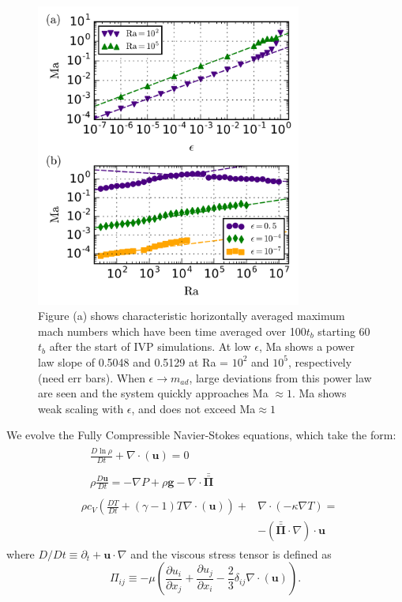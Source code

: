 \documentclass[aps, prl, twocolumn, groupedaddress, amsfonts, amssymb, amsmath]{revtex4-1}
\newcommand{\Div}[1]{\ensuremath{\nabla\cdot\left( #1\right)}}
\newcommand{\grad}{\ensuremath{\nabla}}
\newcommand{\stressT}{\ensuremath{\bm{\bar{\bar{\Pi}}}}}
\begin{document}
\begin{figure}[t]
\includegraphics[width=3.4375in]{./figs/ma_v_eps.png}
\caption{Figure (a) shows characteristic horizontally averaged maximum mach numbers which have been
time averaged over 100$t_{b}$ starting 60$t_{b}$ after the start of IVP simulations. At low $\epsilon$,
Ma shows a power law slope of 0.5048 and 0.5129 at Ra = $10^2$ and $10^5$, respectively (need err bars).
When $\epsilon \rightarrow m_{ad}$, large deviations from this power law are seen and the system quickly
approaches Ma $\approx 1$.  Ma shows weak scaling with $\epsilon$, and does not exceed Ma$ \approx 1$
\label{fig:ma_v_eps} }
\end{figure}

We evolve the Fully Compressible Navier-Stokes equations,
which take the form:
\begin{align}
&\begin{aligned}
&\frac{D \ln\rho}{D t} + \Div{\bm{u}} = 0
	\label{eqn:continuity_eqn}
\end{aligned}\\
&\begin{aligned}
&\rho\frac{D\bm{u}}{D t}=
-\grad P + \rho\bm{g} - \nabla\cdot\stressT
	\label{eqn:momentum_eqn}
\end{aligned}\\
&\begin{aligned}
\rho c_V\left(\frac{D T}{D t} + (\gamma-1)T\Div{\bm{u}}\right) + &\Div{-\kappa\grad T} = \\
&-\left(\stressT\cdot\nabla\right)\cdot\bm{u} 
	\label{eqn:energy_eqn}
\end{aligned}
\end{align}
where $D/Dt \equiv \partial_t + \bm{u}\cdot\grad$ and the viscous stress tensor is defined as
\begin{equation}
\Pi_{ij} \equiv -\mu\left(\frac{\partial u_i}{\partial x_j} + \frac{\partial u_j}{\partial x_i} - \frac{2}{3}\delta_{ij}\Div{\bm{u}}\right).
	\label{eqn:stress_tensor}
\end{equation}
\end{document}
